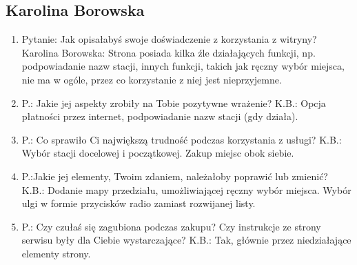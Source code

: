 \documentclass{article}
\begin{document}
\subsection{Karolina Borowska}
\begin{enumerate}
\item Pytanie: Jak opisałabyś swoje doświadczenie z korzystania z witryny? \newline
Karolina Borowska: Strona posiada kilka źle działających funkcji, np. podpowiadanie nazw stacji, innych funkcji,
takich jak ręczny wybór miejsca, nie ma w ogóle, przez co korzystanie z niej jest nieprzyjemne.
\item P.: Jakie jej aspekty zrobiły na Tobie pozytywne wrażenie? \newline
K.B.: Opcja płatności przez internet, podpowiadanie nazw stacji (gdy działa).
\item P.: Co sprawiło Ci największą trudność podczas korzystania z usługi? \newline
K.B.: Wybór stacji docelowej i początkowej. Zakup miejsc obok siebie.
\item P.:Jakie jej elementy, Twoim zdaniem, należałoby poprawić lub zmienić? \newline
K.B.: Dodanie mapy przedziału, umożliwiającej ręczny wybór miejsca. Wybór ulgi
w formie przycisków radio zamiast rozwijanej listy.
\item P.: Czy czułaś się zagubiona podczas zakupu? Czy instrukcje ze strony serwisu były dla Ciebie wystarczające? \newline
K.B.: Tak, głównie przez niedziałające elementy strony.
\end{enumerate}
\end{document}
